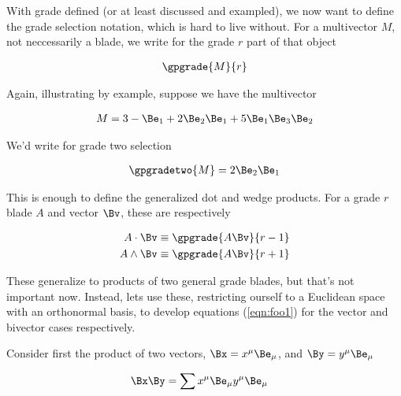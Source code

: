 With grade defined (or at least discussed and exampled), we now want to define the grade selection notation, which is hard to live without.  For a multivector $M$, not neccessarily a blade, we write for the grade $r$ part of that object

\begin{align}\label{eqn:foo3}
\gpgrade{M}{r}
\end{align}

Again, illustrating by example, suppose we have the multivector

\begin{align*}
M = 3 -\Be_1 + 2 \Be_2 \Be_1 + 5 \Be_1 \Be_3 \Be_2 
\end{align*}

We'd write for grade two selection

\begin{align*}
\gpgradetwo{M} = 2 \Be_2 \Be_1
\end{align*}

This is enough to define the generalized dot and wedge products.  For a grade $r$ blade $A$ and vector $\Bv$, these are respectively

\begin{align}\label{eqn:foo4}
A \cdot \Bv &\equiv \gpgrade{A \Bv}{r-1} \\
A \wedge \Bv &\equiv \gpgrade{A \Bv}{r+1} 
\end{align}

These generalize to products of two general grade blades, but that's not important now.  Instead, lets use these, restricting ourself to a Euclidean space with an orthonormal basis, to develop equations (\ref{eqn:foo1}) for the vector and bivector cases respectively.

Consider first the product of two vectors, $\Bx = x^\mu \Be_\mu$, and $\By = y^\mu \Be_\mu$

\begin{align*}
\Bx \By &= \sum x^\mu \Be_\mu y^\mu \Be_\mu
\end{align*}

\EndNoBibArticle

